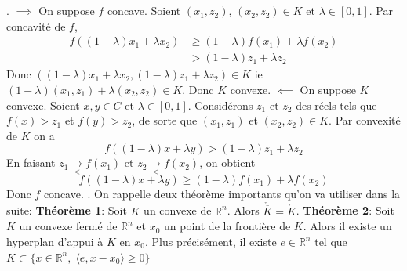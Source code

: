 \documentclass{report}
\begin{document}
\subsection{} \noindent{}\\ 
\\ 
\\
. $\implies$ On suppose $f$ concave. Soient $(x_1,z_2)$, $(x_2,z_2)\in K$ et $\lambda \in [0,1]$. Par concavité de $f$,
$$\begin{aligned}
f((1-\lambda)x_1+\lambda x_2) &\geq (1-\lambda)f(x_1) + \lambda f(x_2)\\
&> (1-\lambda)z_1 + \lambda z_2
\end{aligned}$$
Donc $((1-\lambda)x_1+\lambda x_2, (1-\lambda)z_1 + \lambda z_2)\in K$ ie $(1-\lambda)(x_1,z_1)+\lambda (x_2,z_2)\in K$. \newline
Donc $K$ convexe. \newline 
\newline
$\impliedby$ On suppose $K$ convexe. Soient $x,y\in C$ et $\lambda \in [0,1]$. Considérons $z_1$ et $z_2$ des réels tels que $f(x)>z_1$ et $f(y)>z_2$, de sorte que $(x_1,z_1)$ et $(x_2,z_2)\in K$. Par convexité de $K$ on a $$f((1-\lambda)x+\lambda y)>(1-\lambda)z_1 + \lambda z_2 $$
En faisant $z_1\xrightarrow[<]{}f(x_1)$ et $z_2\xrightarrow[<]{}f(x_2)$, on obtient $$f((1-\lambda)x+\lambda y)\geq (1-\lambda)f(x_1) + \lambda f(x_2) $$
Donc $f$ concave.\newline
{}. On rappelle deux théorème importants qu'on va utiliser dans la suite:\newline
\textbf{Théorème 1}: Soit $K$ un convexe de $\mathbb R^n$. Alors $\mathring{\overline K} = \mathring K$.\newline 
\textbf{Théorème 2}: Soit $K$ un convexe fermé de $\mathbb R^n$ et $x_0$ un point de la frontière de $K$. Alors il existe un hyperplan d'appui à $K$ en $x_0$. Plus précisément, il existe $e\in \mathbb R^n$ tel que $K\subset \{x\in \mathbb R^n, \; \langle e,x-x_0\rangle\geq 0\}$ \newline 
\end{document}
